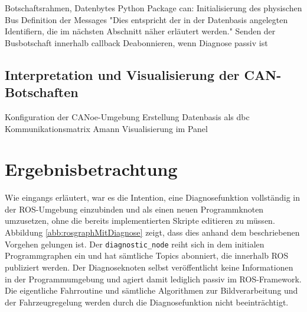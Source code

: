 Botschaftsrahmen, Datenbytes
Python Package can:
Initialisierung des physischen Bus
Definition der Messages
"Dies entspricht der in der Datenbasis angelegten Identifiern, die im nächsten Abschnitt näher erläutert werden."
Senden der Busbotschaft innerhalb callback
Deabonnieren, wenn Diagnose passiv ist


\subsection{Interpretation und Visualisierung der CAN-Botschaften}\label{subsec:ImplementierungCANoe}
Konfiguration der CANoe-Umgebung
Erstellung Datenbasis als dbc
Kommunikationsmatrix Amann
Visualisierung im Panel


\begin{comment}
	Dummy-Botschaften über Python, ...
	Skriptsprache Python
	Package python-can
	Einbindung in ROS --> neuer Knoten
	Abonnieren sämtlicher Knoten
	Besonderheit callback-Funktion
	Deabonnieren, wenn Diagnose passiv ist
	Programmablaufplan
	Datentypen: Variablen in char Arrays wandeln
	IEEE Umrechnung von float-Variablen
	Empfänger: 	Datenbasis als dbc.File
	Visualisierung in Diagnose-Panel
	Timing (eher in kritische Betrachtung, globales Timing angepasst)
	
	\begin{figure}[!htbp]
	\centering
	\texttt{[image: ./Diagnose-Kommunikationsprinzip]}
	\caption{ASAM/ISO-Diagnose-Server-Prinzip (Kommunikationsprinzip) [Reif]}
	\label{abb:DiagnoseKommunkationsprinzip}
	\end{figure}
	
\end{comment}





\section{Ergebnisbetrachtung} \label{sec:ErgebnisDiagnose} %

Wie eingangs erläutert, war es die Intention, eine Diagnosefunktion  vollständig in der ROS-Umgebung einzubinden und als einen neuen Programmknoten umzusetzen, ohne die bereits implementierten Skripte editieren zu müssen. Abbildung \ref{abb:rosgraphMitDiagnose} zeigt, dass dies anhand dem beschriebenen Vorgehen gelungen ist. Der \texttt{diagnostic\_node} reiht sich in dem initialen Programmgraphen ein und hat sämtliche Topics abonniert, die innerhalb ROS publiziert werden. Der Diagnoseknoten selbst veröffentlicht keine Informationen in der Programmumgebung und agiert damit lediglich passiv im ROS-Framework. Die eigentliche Fahrroutine und sämtliche Algorithmen zur Bildverarbeitung und der Fahrzeugregelung werden durch die Diagnosefunktion nicht beeinträchtigt.

